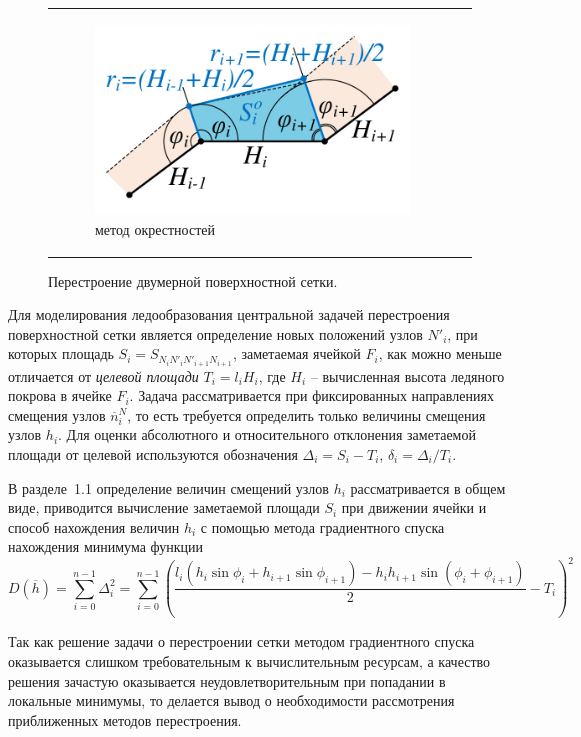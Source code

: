 \documentclass[a4paper,14pt]{extarticle}                     %
\theoremstyle{plain}                                         %
\begin{document}
\begin{figure}[ht]
\begin{tabular}{ll}
\begin{subfigure}{0.45\textwidth}\centering\includegraphics[width=0.75\columnwidth]{fig/2dr_remesh_okrestnost_big.pdf}\caption{метод окрестностей}\end{subfigure}
\end{tabular}
\singlespacing
\caption{Перестроение двумерной поверхностной сетки.}
\label{fig:remesh_2d}
\end{figure}

Для моделирования ледообразования центральной задачей перестроения поверхностной сетки является определение новых положений узлов $N'_i$, при которых площадь $S_i = S_{N_iN'_iN'_{i+1}N_{i+1}}$, заметаемая ячейкой $F_i$, как можно меньше отличается от \textit{целевой площади} $T_i = l_i H_i$, где $H_i$ -- вычисленная высота ледяного покрова в ячейке $F_i$.
Задача рассматривается при фиксированных направлениях смещения узлов $\overline{n}_i^N$, то есть требуется определить только величины смещения узлов $h_i$.
Для оценки абсолютного и относительного отклонения заметаемой площади от целевой используются обозначения $\Delta_i = S_i - T_i$, $\delta_i = \Delta_i / T_i$.


В разделе~1.1 определение величин смещений узлов $h_i$ рассматривается в общем виде, приводится вычисление заметаемой площади $S_i$ при движении ячейки и способ нахождения величин $h_i$ с помощью метода градиентного спуска нахождения минимума функции
\begin{equation*}
	D(\overline{h}) = \sum_{i = 0}^{n - 1}{\Delta_i^2} = \sum_{i = 0}^{n - 1}{ \left( \frac{ l_i(h_i \sin \phi_i + h_{i + 1} \sin \phi_{i+1}) - h_ih_{i + 1} \sin(\phi_i + \phi_{i+1}) }{2} - T_i \right)^2}
\end{equation*}

Так как решение задачи о перестроении сетки методом градиентного спуска оказывается слишком требовательным к вычислительным ресурсам, а качество решения зачастую оказывается неудовлетворительным при попадании в локальные минимумы, то делается вывод о необходимости рассмотрения приближенных методов перестроения.
\end{document}
